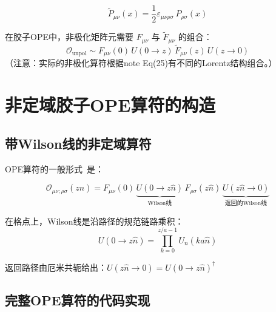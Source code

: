 \documentclass[12pt,a4paper]{ctexart}
\begin{document}
\begin{physbox}[对偶变换的数学表达]
\begin{equation}
    \tilde{P}_{\mu\nu}(x) = \frac{1}{2} \varepsilon_{\mu\nu\rho\sigma} \, P_{\rho\sigma}(x)
    \label{eq:dual_plaquette}
\end{equation}

在胶子OPE中，非极化矩阵元需要 $F_{\mu\nu}$ 与 $\tilde{F}_{\mu\nu}$ 的组合：
\begin{equation}
    \mathcal{O}_{\text{unpol}} \sim F_{\mu\nu}(0) \, U(0\to z) \, \tilde{F}_{\mu\nu}(z) \, U(z\to 0)
\end{equation}
（注意：实际的非极化算符根据note Eq(25)有不同的Lorentz结构组合。）
\end{physbox}

\section{非定域胶子OPE算符的构造}

\subsection{带Wilson线的非定域算符}

OPE算符的一般形式~\cite{Note_of_gluon_PDFs,Gluon_Quasi_PDF}是：

\begin{physbox}[非定域胶子算符]
\begin{equation}
    \mathcal{O}_{\mu\nu;\rho\sigma}(z\hat{n}) =
    F_{\mu\nu}(0) \,
    \underbrace{U(0\to z\hat{n})}_{\text{Wilson线}} \,
    F_{\rho\sigma}(z\hat{n}) \,
    \underbrace{U(z\hat{n}\to 0)}_{\text{返回的Wilson线}}
    \label{eq:nonlocal_op}
\end{equation}

在格点上，Wilson线是沿路径的规范链路乘积：
\begin{equation}
    U(0\to z\hat{n}) = \prod_{k=0}^{z/a-1} U_{n}(k a \hat{n})
    \label{eq:wilson_line}
\end{equation}

返回路径由厄米共轭给出：$U(z\hat{n}\to 0) = U(0\to z\hat{n})^\dagger$
\end{physbox}

\subsection{完整OPE算符的代码实现}
\end{document}
